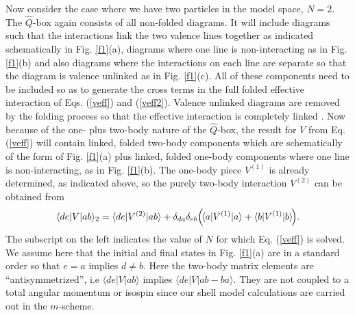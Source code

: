 \documentclass[prc,aps,amsmath,amssymb,preprintnumbers,showpacs,twocolumn]{revtex4}
\begin{document}
Now consider the case where we have two particles in the model space, $N=2$.
The $\hat{Q}$-box again consists  of all non-folded diagrams. It will 
include diagrams such that the interactions link the two valence 
lines together as indicated schematically in Fig. \ref{f1}(a), diagrams where
one line is non-interacting as in Fig. \ref{f1}(b) and also diagrams where
the interactions on each line are separate so that the diagram is 
valence unlinked as in Fig. \ref{f1}(c). All of these components need to 
be included so as to generate the cross terms in the full folded effective
interaction of Eqs. (\ref{veff}) and (\ref{veff2}). %
Valence unlinked diagrams are removed by
the folding process so that
the effective interaction is completely linked \cite{bran}.
Now because of the one- plus two-body nature of the $\hat{Q}$-box, the 
result for $V$ from Eq. (\ref{veff}) will contain linked, folded 
two-body components which are schematically of the form of Fig. \ref{f1}(a) 
plus linked, folded 
one-body components where one line is non-interacting, as in 
Fig. \ref{f1}(b). The one-body piece $V^{(1)}$ is already determined, 
as indicated above, so the purely two-body interaction $V^{(2)}$ can be 
obtained from
\begin{equation}
\langle de|V|ab\rangle_2=\langle de|V^{(2)}|ab\rangle 
+\delta_{da}\delta_{eb}\Bigl(\!\langle a|V^{(1)}|a\rangle
+\langle b|V^{(1)}|b\rangle\!\Bigr). \label{whole2}
\end{equation}
The subscript on the left indicates the value of $N$ for which 
Eq. (\ref{veff}) is solved.
We assume here that the initial and final states in Fig. \ref{f1}(a) are
in a standard order so that $e=a$ implies $d\neq b$. Here the two-body 
matrix elements are ``antisymmetrized'', i.e $\langle de|V|ab\rangle$
implies $\langle de|V|ab-ba\rangle$. They are not coupled to a total
angular momentum or isospin since our shell model calculations are 
carried out in the $m$-scheme.
\end{document}
